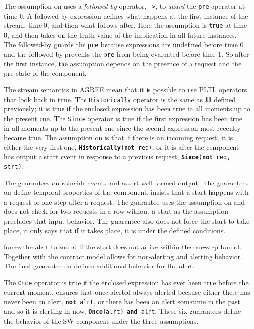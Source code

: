 The assumption on  uses a \emph{followed-by} operator, \texttt{->}, to \emph{guard} the \texttt{pre} operator at time 0.
A followed-by expression defines what happens at the first instance of the stream, time 0, and then what follows after. 
Here the assumption is \texttt{true} at time 0, and then takes on the truth value of the implication in all future instances.
The followed-by guards the \texttt{pre} because expressions are undefined before time 0 and the followed-by prevents the \texttt{pre} from being evaluated before time 1.
So after the first instance, the assumption depends on the presence of a request and the pre-state of the component.

The stream semantics in AGREE mean that it is possible to use PLTL operators that look back in time.
The \texttt{Historically} operator is the same as $\mathbf{H}$ defined previously; it is true if the enclosed expression has been true in all moments up to the present one. 
The \texttt{Since} operator is true if the first expression has been true in all moments up to the present one since the second expression most recently became true.
The assumption on  is that if there is an incoming request, it is either the very first one, \texttt{\textbf{Historically}(\textbf{not} req)}, or it is after the component has output a start event in response to a previous request, \texttt{\textbf{Since}(\textbf{not} req, strt)}.

The guarantees on  coincide events and assert well-formed output.
The guarantees on  define temporal properties of the component.
 insists that a start happens with a request or one step after a request.
The guarantee uses the assumption on  and does not check for two requests in a row without a start as the assumption precludes that input behavior.
The guarantee also does not force the start to take place, it only says that if it takes place, it is under the defined conditions.

 forces the alert to sound if the start does not arrive within the one-step bound.
Together with  the contract model allows for non-alerting and alerting behavior.
The final guarantee on  defines additional behavior for the alert.

The \texttt{Once} operator is true if the enclosed expression has ever been true before the current moment.
 ensures that once alerted always alerted because either there has never been an alert, \texttt{\textbf{not} alrt}, or there has been an alert sometime in the past and so it is alerting in now, \texttt{\textbf{Once}(alrt) \textbf{and} alrt}.
These six guarantees define the behavior of the SW component under the three assumptions.

